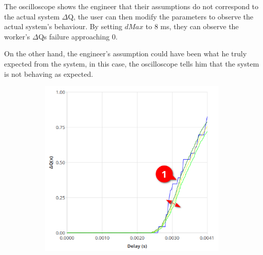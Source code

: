     The oscilloscope shows the engineer that their assumptions do not correspond to the actual system $\Delta$Q, the user can then modify the parameters to observe the actual system's behaviour. By setting $dMax$ to 8 ms, they can observe the worker's $\Delta$Qs failure approaching 0.

    On the other hand, the engineer's assumption could have been what he truly expected from the system, in this case, the oscilloscope tells him that the system is not behaving as expected. 
\begin{figure}[H]
            \centering
            \begin{subfigure}{.5\textwidth}
                \centering
                \includegraphics[width=0.98\textwidth]{img/overload_2/worker_1a.png}
                \label{fig:w14}
            \end{subfigure}%
            \begin{subfigure}{.5\textwidth}
                \centering

\end{subfigure}
\end{figure}

